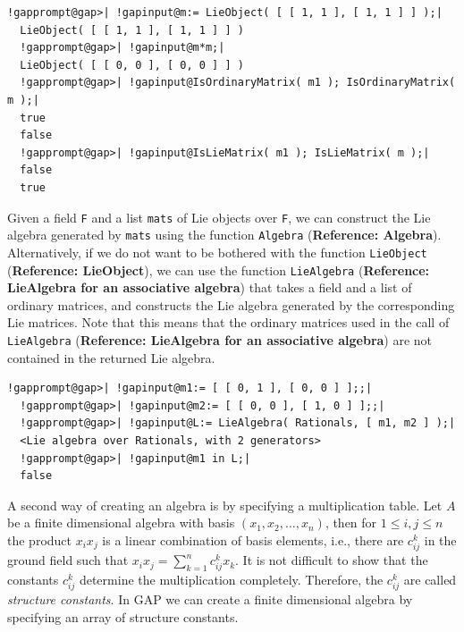 \documentclass[a4paper,11pt]{report}
\begin{document}
{{ 
\begin{Verbatim}[commandchars=!@|,fontsize=\small,frame=single,label=Example]
  !gapprompt@gap>| !gapinput@m:= LieObject( [ [ 1, 1 ], [ 1, 1 ] ] );|
  LieObject( [ [ 1, 1 ], [ 1, 1 ] ] )
  !gapprompt@gap>| !gapinput@m*m;|
  LieObject( [ [ 0, 0 ], [ 0, 0 ] ] )
  !gapprompt@gap>| !gapinput@IsOrdinaryMatrix( m1 ); IsOrdinaryMatrix( m );|
  true
  false
  !gapprompt@gap>| !gapinput@IsLieMatrix( m1 ); IsLieMatrix( m );|
  false
  true
\end{Verbatim}
 

 Given a field \texttt{F} and a list \texttt{mats} of Lie objects over \texttt{F}, we can construct the Lie algebra generated by \texttt{mats} using the function \texttt{Algebra} (\textbf{Reference: Algebra}). Alternatively, if we do not want to be bothered with the function \texttt{LieObject} (\textbf{Reference: LieObject}), we can use the function \texttt{LieAlgebra} (\textbf{Reference: LieAlgebra for an associative algebra}) that takes a field and a list of ordinary matrices, and constructs the Lie
algebra generated by the corresponding Lie matrices. Note that this means that
the ordinary matrices used in the call of \texttt{LieAlgebra} (\textbf{Reference: LieAlgebra for an associative algebra}) are not contained in the returned Lie algebra. 

 
\begin{Verbatim}[commandchars=!@|,fontsize=\small,frame=single,label=Example]
  !gapprompt@gap>| !gapinput@m1:= [ [ 0, 1 ], [ 0, 0 ] ];;|
  !gapprompt@gap>| !gapinput@m2:= [ [ 0, 0 ], [ 1, 0 ] ];;|
  !gapprompt@gap>| !gapinput@L:= LieAlgebra( Rationals, [ m1, m2 ] );|
  <Lie algebra over Rationals, with 2 generators>
  !gapprompt@gap>| !gapinput@m1 in L;|
  false
\end{Verbatim}
 

 A second way of creating an algebra is by specifying a multiplication table.
Let $A$ be a finite dimensional algebra with basis $(x_1, x_2, \ldots, x_n)$, then for $1 \leq i, j \leq n$ the product $x_i x_j$ is a linear combination of basis elements, i.e., there are $c_{ij}^k$ in the ground field such that $x_i x_j = \sum_{k=1}^n c_{ij}^k x_k.$ It is not difficult to show that the constants $c_{ij}^k$ determine the multiplication completely. Therefore, the $c_{ij}^k$ are called \emph{structure constants}. In \textsf{GAP} we can create a finite dimensional algebra by specifying an array of structure
constants. 

}}
\end{document}
